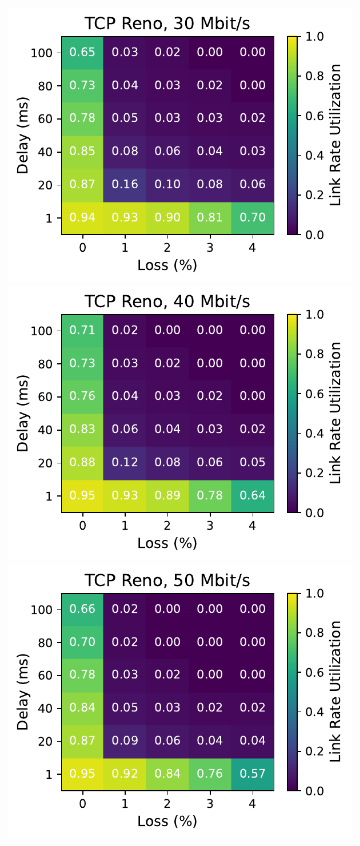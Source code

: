 \begin{figure}[ht]
\begin{subfigure}[b]{0.22\linewidth}
        \includegraphics[width=\linewidth,trim={0 0 2cm 0},clip]{figures/heatmaps/heatmap_tcp_reno_30mbps.pdf}
        \includegraphics[width=\linewidth,trim={0 0 2cm 0},clip]{figures/heatmaps/heatmap_tcp_reno_40mbps.pdf}
        \includegraphics[width=\linewidth,trim={0 0 2cm 0},clip]{figures/heatmaps/heatmap_tcp_reno_50mbps.pdf}

\end{subfigure}
\end{figure}
